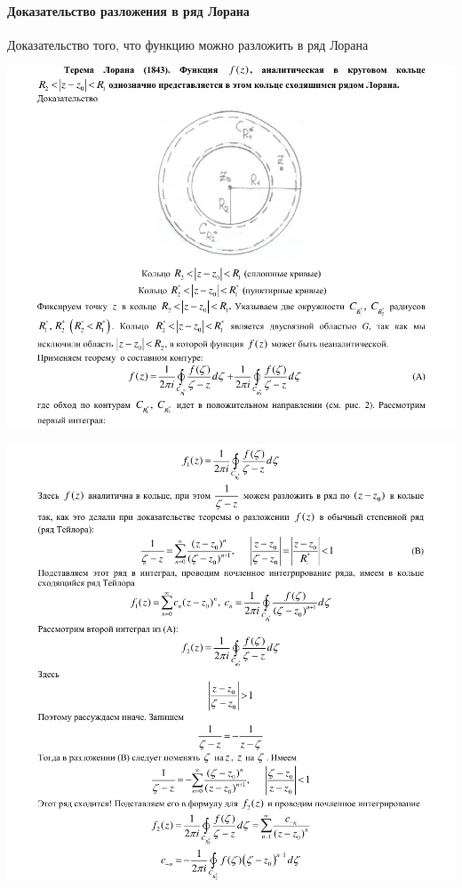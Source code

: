 \documentclass[12pt]{extarticle}
\begin{document}
\paragraph{Доказательство разложения в ряд Лорана}
Доказательство того, что функцию можно разложить в ряд Лорана
\par\includegraphics[width=\textwidth]{proof_loran_1}
\par\includegraphics[width=\textwidth]{proof_loran_2}
\end{document}
